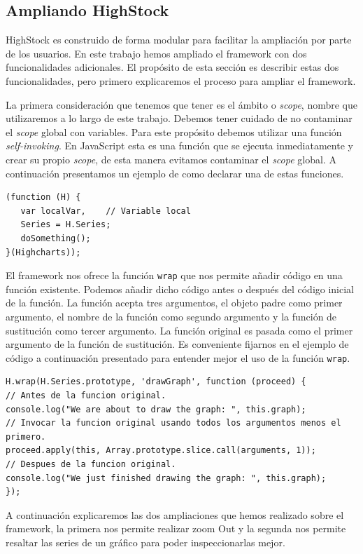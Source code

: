 	\subsection{Ampliando HighStock}
		HighStock es construido de forma modular para facilitar la ampliación por parte de los usuarios. En este trabajo hemos ampliado el
		framework con dos funcionalidades adicionales. El propósito de esta sección es describir estas dos funcionalidades, pero primero
		explicaremos el proceso para ampliar el framework.
		\par
		La primera consideración que tenemos que tener es el ámbito o \emph{scope}, nombre que utilizaremos a lo largo de este trabajo.
		Debemos tener cuidado de no contaminar el \emph{scope} global con variables. Para este propósito debemos utilizar una función
		\emph{self-invoking}. En JavaScript esta es una función que se ejecuta inmediatamente y crear su propio \emph{scope}, de esta manera
		evitamos contaminar el \emph{scope} global. A continuación presentamos un ejemplo de como declarar una de estas funciones.
		\begin{lstlisting}
(function (H) {
   var localVar,	// Variable local
   Series = H.Series;
   doSomething();
}(Highcharts));
		\end{lstlisting}
		\par
		El framework nos ofrece la función \texttt{wrap} que nos permite añadir código en una función existente. Podemos añadir dicho código
		antes o después del código inicial de la función. La función acepta tres argumentos, el objeto padre como primer argumento, el nombre
		de la función como segundo argumento y la función de sustitución como tercer argumento. La función original es pasada como el primer
		argumento de la función de sustitución. Es conveniente fijarnos en el ejemplo de código a continuación presentado para entender mejor
		el uso de la función \texttt{wrap}.
		\begin{lstlisting}
H.wrap(H.Series.prototype, 'drawGraph', function (proceed) {
// Antes de la funcion original.
console.log("We are about to draw the graph: ", this.graph);
// Invocar la funcion original usando todos los argumentos menos el primero.
proceed.apply(this, Array.prototype.slice.call(arguments, 1));
// Despues de la funcion original.
console.log("We just finished drawing the graph: ", this.graph);
});
		\end{lstlisting}
		\par  
		A continuación explicaremos las dos ampliaciones que hemos realizado sobre el framework, la primera nos permite realizar zoom Out y la
		segunda nos permite resaltar las series de un gráfico para poder inspeccionarlas mejor.
